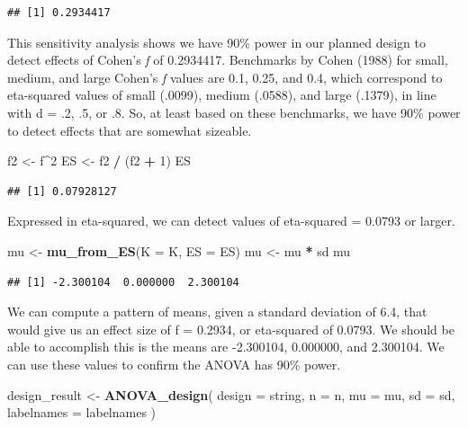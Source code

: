 \documentclass[]{book}
\newenvironment{Shaded}{\begin{snugshade}}{\end{snugshade}}
\newcommand{\DataTypeTok}[1]{\textcolor[rgb]{0.13,0.29,0.53}{#1}}
\newcommand{\DecValTok}[1]{\textcolor[rgb]{0.00,0.00,0.81}{#1}}
\newcommand{\KeywordTok}[1]{\textcolor[rgb]{0.13,0.29,0.53}{\textbf{#1}}}
\newcommand{\NormalTok}[1]{#1}
\newcommand{\OperatorTok}[1]{\textcolor[rgb]{0.81,0.36,0.00}{\textbf{#1}}}
\newcommand{\StringTok}[1]{\textcolor[rgb]{0.31,0.60,0.02}{#1}}
\begin{document}
\begin{verbatim}
## [1] 0.2934417
\end{verbatim}

This sensitivity analysis shows we have 90\% power in our planned design to detect effects of Cohen's \emph{f} of 0.2934417. Benchmarks by Cohen (1988) for small, medium, and large Cohen's \emph{f} values are 0.1, 0.25, and 0.4, which correspond to eta-squared values of small (.0099), medium (.0588), and large (.1379), in line with d = .2, .5, or .8. So, at least based on these benchmarks, we have 90\% power to detect effects that are somewhat sizeable.

\begin{Shaded}
\begin{Highlighting}[]
\NormalTok{f2 <-}\StringTok{ }\NormalTok{f}\OperatorTok{^}\DecValTok{2}
\NormalTok{ES <-}\StringTok{ }\NormalTok{f2 }\OperatorTok{/}\StringTok{ }\NormalTok{(f2 }\OperatorTok{+}\StringTok{ }\DecValTok{1}\NormalTok{)}
\NormalTok{ES}
\end{Highlighting}
\end{Shaded}

\begin{verbatim}
## [1] 0.07928127
\end{verbatim}

Expressed in eta-squared, we can detect values of eta-squared = 0.0793 or larger.

\begin{Shaded}
\begin{Highlighting}[]
\NormalTok{mu <-}\StringTok{ }\KeywordTok{mu_from_ES}\NormalTok{(}\DataTypeTok{K =}\NormalTok{ K, }\DataTypeTok{ES =}\NormalTok{ ES)}
\NormalTok{mu <-}\StringTok{ }\NormalTok{mu }\OperatorTok{*}\StringTok{ }\NormalTok{sd}
\NormalTok{mu}
\end{Highlighting}
\end{Shaded}

\begin{verbatim}
## [1] -2.300104  0.000000  2.300104
\end{verbatim}

We can compute a pattern of means, given a standard deviation of 6.4, that would give us an effect size of f = 0.2934, or eta-squared of 0.0793. We should be able to accomplish this is the means are -2.300104, 0.000000, and 2.300104. We can use these values to confirm the ANOVA has 90\% power.

\begin{Shaded}
\begin{Highlighting}[]
\NormalTok{design_result <-}\StringTok{ }\KeywordTok{ANOVA_design}\NormalTok{(}
  \DataTypeTok{design =}\NormalTok{ string,}
  \DataTypeTok{n =}\NormalTok{ n,}
  \DataTypeTok{mu =}\NormalTok{ mu,}
  \DataTypeTok{sd =}\NormalTok{ sd,}
  \DataTypeTok{labelnames =}\NormalTok{ labelnames}
\NormalTok{  )}
\end{Highlighting}
\end{Shaded}
\end{document}
